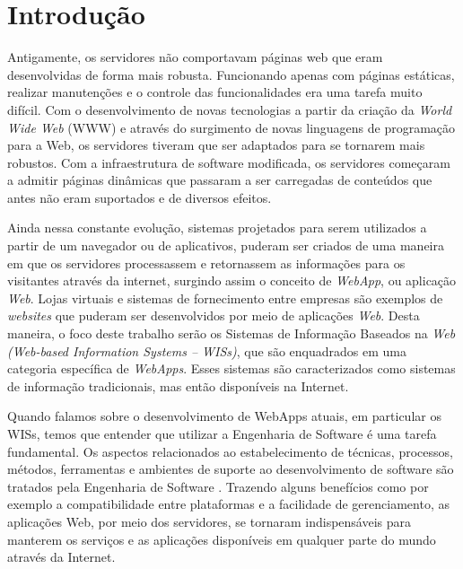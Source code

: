 
\section{Introdução}
\label{sec-intro}


Antigamente, os servidores não comportavam páginas web que eram desenvolvidas de forma mais robusta. Funcionando apenas com páginas estáticas, realizar manutenções e o controle das funcionalidades era uma tarefa muito difícil. Com o desenvolvimento de novas tecnologias a partir da criação da \textit{World Wide Web} (WWW) e através do surgimento de novas linguagens de programação para a Web, os servidores tiveram que ser adaptados para se tornarem mais robustos. Com a infraestrutura de software modificada, os servidores começaram a admitir páginas dinâmicas que passaram a ser carregadas de conteúdos que antes não eram suportados e de diversos efeitos.

Ainda nessa constante evolução, sistemas projetados para serem utilizados a partir de um navegador ou de aplicativos, puderam ser criados de uma maneira em que os servidores processassem e retornassem as informações para os visitantes através da internet, surgindo assim o conceito de \textit{WebApp}, ou aplicação \textit{Web}. Lojas virtuais e sistemas de fornecimento entre empresas são exemplos de \textit{websites} que puderam ser desenvolvidos por meio de aplicações \textit{Web}. Desta maneira, o foco deste trabalho serão os Sistemas de Informação Baseados na \textit{Web (Web-based Information Systems – WISs)}, que são enquadrados em uma categoria específica de \textit{WebApps}. Esses sistemas são caracterizados como sistemas de informação tradicionais, mas então disponíveis na Internet.

Quando falamos sobre o desenvolvimento de WebApps atuais, em particular os WISs, temos que entender que utilizar a Engenharia de Software é uma tarefa fundamental. Os aspectos relacionados ao estabelecimento de técnicas, processos, métodos, ferramentas e ambientes de suporte ao desenvolvimento de software são tratados pela Engenharia de Software \cite{falbo:es14}. Trazendo alguns benefícios como por exemplo a compatibilidade entre plataformas e a facilidade de gerenciamento, as aplicações Web, por meio dos servidores, se tornaram indispensáveis para manterem os serviços e as aplicações disponíveis em qualquer parte do mundo através da Internet. 